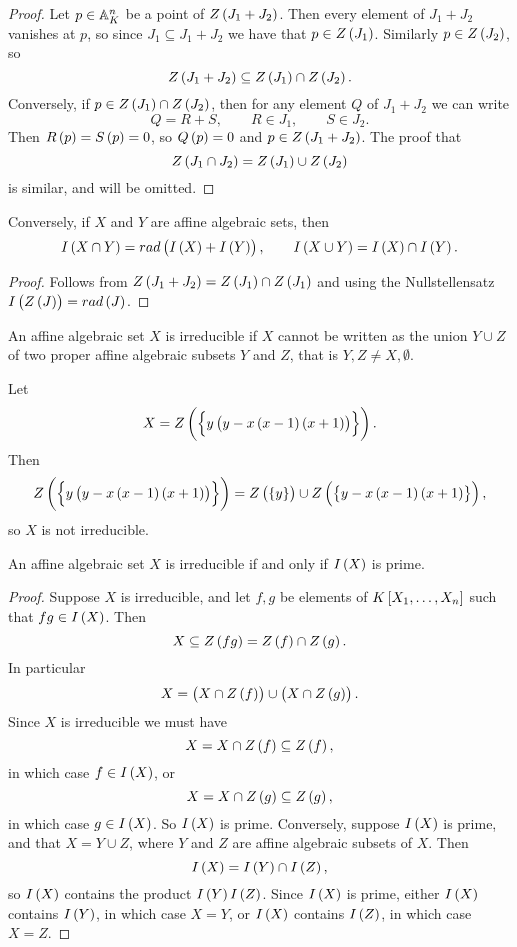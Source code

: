 \begin{proof}
Let $ p \in \mathbb{A}_K^n $ be a point of $ Z\br{J_1 + J_2} $. Then every element of $ J_1 + J_2 $ vanishes at $ p $, so since $ J_1 \subseteq J_1 + J_2 $ we have that $ p \in Z\br{J_1} $. Similarly $ p \in Z\br{J_2} $, so
$$ Z\br{J_1 + J_2} \subseteq Z\br{J_1} \cap Z\br{J_2}. $$
Conversely, if $ p \in Z\br{J_1} \cap Z\br{J_2} $, then for any element $ Q $ of $ J_1 + J_2 $ we can write
$$ Q = R + S, \qquad R \in J_1, \qquad S \in J_2. $$
Then $ R\br{p} = S\br{p} = 0 $, so $ Q\br{p} = 0 $ and $ p \in Z\br{J_1 + J_2} $. The proof that
$$ Z\br{J_1 \cap J_2} = Z\br{J_1} \cup Z\br{J_2} $$
is similar, and will be omitted.
\end{proof}

\begin{corollary}
Conversely, if $ X $ and $ Y $ are affine algebraic sets, then
$$ I\br{X \cap Y} = rad\br{I\br{X} + I\br{Y}}, \qquad I\br{X \cup Y} = I\br{X} \cap I\br{Y}. $$
\end{corollary}

\begin{proof}
Follows from $ Z\br{J_1 + J_2} = Z\br{J_1} \cap Z\br{J_1} $ and using the Nullstellensatz $ I\br{Z\br{J}} = rad\br{J} $.
\end{proof}

\begin{definition}
An affine algebraic set $ X $ is irreducible if $ X $ cannot be written as the union $ Y \cup Z $ of two proper affine algebraic subsets $ Y $ and $ Z $, that is $ Y, Z \ne X, \emptyset $.
\end{definition}

\begin{example*}
Let
$$ X = Z\br{\cbr{y\br{y - x\br{x - 1}\br{x + 1}}}}. $$
Then
$$ Z\br{\cbr{y\br{y - x\br{x - 1}\br{x + 1}}}} = Z\br{\cbr{y}} \cup Z\br{\cbr{y - x\br{x - 1}\br{x + 1}}}, $$
so $ X $ is not irreducible.
\end{example*}

\begin{proposition}
An affine algebraic set $ X $ is irreducible if and only if $ I\br{X} $ is prime.
\end{proposition}

\begin{proof}
Suppose $ X $ is irreducible, and let $ f, g $ be elements of $ K\sbr{X_1, \dots, X_n} $ such that $ fg \in I\br{X} $. Then
$$ X \subseteq Z\br{fg} = Z\br{f} \cap Z\br{g}. $$
In particular
$$ X = \br{X \cap Z\br{f}} \cup \br{X \cap Z\br{g}}. $$
Since $ X $ is irreducible we must have
$$ X = X \cap Z\br{f} \subseteq Z\br{f}, $$
in which case $ f \in I\br{X} $, or
$$ X = X \cap Z\br{g} \subseteq Z\br{g}, $$
in which case $ g \in I\br{X} $. So $ I\br{X} $ is prime. Conversely, suppose $ I\br{X} $ is prime, and that $ X = Y \cup Z $, where $ Y $ and $ Z $ are affine algebraic subsets of $ X $. Then
$$ I\br{X} = I\br{Y} \cap I\br{Z}, $$
so $ I\br{X} $ contains the product $ I\br{Y}I\br{Z} $. Since $ I\br{X} $ is prime, either $ I\br{X} $ contains $ I\br{Y} $, in which case $ X = Y $, or $ I\br{X} $ contains $ I\br{Z} $, in which case $ X = Z $.
\end{proof}

